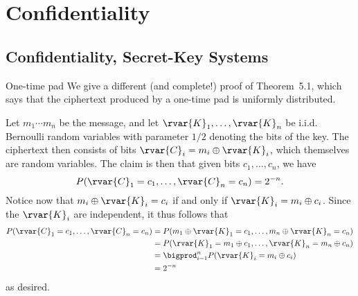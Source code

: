 \documentclass[article, a4paper, 11pt, oneside]{memoir}
\title{\doctitle}
\author{\docauthor}
\numberwithin{equation}{chapter}
\begin{document}
\maketitle

\addtocounter{chapter}{4}
\chapter{Confidentiality}

\section{Confidentiality, Secret-Key Systems}

\newcommand{\xor}{\oplus}

\begin{notelist}
\item[One-time pad]
We give a different (and complete!) proof of Theorem~5.1, which says that the ciphertext produced by a one-time pad is uniformly distributed.

Let $m_1 \cdots m_n$ be the message, and let $\rvar{K}_1, \ldots, \rvar{K}_n$ be i.i.d. Bernoulli random variables with parameter $1/2$ denoting the bits of the key. The ciphertext then consists of bits $\rvar{C}_i = m_i \xor \rvar{K}_i$, which themselves are random variables. The claim is then that given bits $c_1, \ldots, c_n$, we have
%
\begin{equation*}
    P(\rvar{C}_1 = c_1, \ldots, \rvar{C}_n = c_n) = 2^{-n}.
\end{equation*}
%
Notice now that $m_i \xor \rvar{K}_i = c_i$ if and only if $\rvar{K}_i = m_i \xor c_i$. Since the $\rvar{K}_i$ are independent, it thus follows that
%
\begin{align*}
    P(\rvar{C}_1 = c_1, \ldots, \rvar{C}_n = c_n)
        &= P(m_1 \xor \rvar{K}_1 = c_1, \ldots, m_n \xor \rvar{K}_n = c_n) \\
        &= P(\rvar{K}_1 = m_1 \xor c_1, \ldots, \rvar{K}_n = m_n \xor c_n) \\
        &= \bigprod_{i=1}^n P(\rvar{K}_i = m_i \xor c_i) \\
        &= 2^{-n}
\end{align*}
%
as desired.
\end{notelist}
\end{document}
